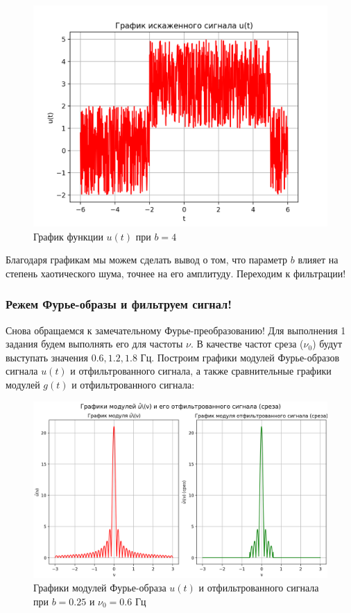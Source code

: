 \begin{figure}[ht!]
    \centering
    \includegraphics[scale=0.75]{media/1 task/high_freq/Noisy_4.png}
    \caption{График функции $u(t)$ при $b=4$}
    \label{fig:noisy_4}
\end{figure}

Благодаря графикам мы можем сделать вывод о том, что параметр $b$ влияет на степень хаотического шума, точнее на его амплитуду. Переходим к фильтрации!
\subsubsection{Режем Фурье-образы и фильтруем сигнал!}
 
Снова обращаемся к замечательному Фурье-преобразованию! Для выполнения 1 задания будем выполнять его для частоты $\nu$. В качестве частот среза ($\nu_0$) будут выступать значения $0.6, 1.2, 1.8$ Гц. Построим графики модулей Фурье-образов сигнала $u(t)$ и отфильтрованного сигнала, а также сравнительные графики модулей $g(t)$ и отфильтрованного сигнала:

\begin{figure}[ht!]
    \centering
    \includegraphics[scale=0.55]{media/1 task/high_freq/Fourier_Image_0,25_-0,5975975975975976.png}
    \caption{Графики модулей Фурье-образа $u(t)$ и отфильтрованного сигнала при $b=0.25$ и $\nu_0=0.6$ Гц}
    \label{fig:four_025_06}
\end{figure}

